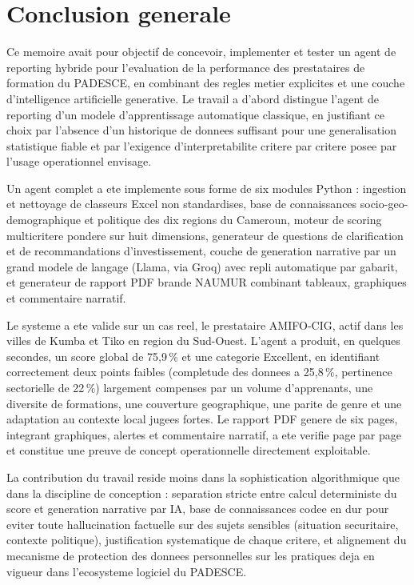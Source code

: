 \documentclass[12pt,a4paper,twoside,openany]{report}
\begin{document}
\newpage


\chapter*{Conclusion generale}

Ce memoire avait pour objectif de concevoir, implementer et tester un agent de reporting hybride pour l'evaluation de la performance des prestataires de formation du PADESCE, en combinant des regles metier explicites et une couche d'intelligence artificielle generative. Le travail a d'abord distingue l'agent de reporting d'un modele d'apprentissage automatique classique, en justifiant ce choix par l'absence d'un historique de donnees suffisant pour une generalisation statistique fiable et par l'exigence d'interpretabilite critere par critere posee par l'usage operationnel envisage.

Un agent complet a ete implemente sous forme de six modules Python : ingestion et nettoyage de classeurs Excel non standardises, base de connaissances socio-geo-demographique et politique des dix regions du Cameroun, moteur de scoring multicritere pondere sur huit dimensions, generateur de questions de clarification et de recommandations d'investissement, couche de generation narrative par un grand modele de langage (Llama, via Groq) avec repli automatique par gabarit, et generateur de rapport PDF brande NAUMUR combinant tableaux, graphiques et commentaire narratif.

Le systeme a ete valide sur un cas reel, le prestataire AMIFO-CIG, actif dans les villes de Kumba et Tiko en region du Sud-Ouest. L'agent a produit, en quelques secondes, un score global de 75,9\,\% et une categorie Excellent, en identifiant correctement deux points faibles (completude des donnees a 25,8\,\%, pertinence sectorielle de 22\,\%) largement compenses par un volume d'apprenants, une diversite de formations, une couverture geographique, une parite de genre et une adaptation au contexte local jugees fortes. Le rapport PDF genere de six pages, integrant graphiques, alertes et commentaire narratif, a ete verifie page par page et constitue une preuve de concept operationnelle directement exploitable.

La contribution du travail reside moins dans la sophistication algorithmique que dans la discipline de conception : separation stricte entre calcul deterministe du score et generation narrative par IA, base de connaissances codee en dur pour eviter toute hallucination factuelle sur des sujets sensibles (situation securitaire, contexte politique), justification systematique de chaque critere, et alignement du mecanisme de protection des donnees personnelles sur les pratiques deja en vigueur dans l'ecosysteme logiciel du PADESCE.
\end{document}

